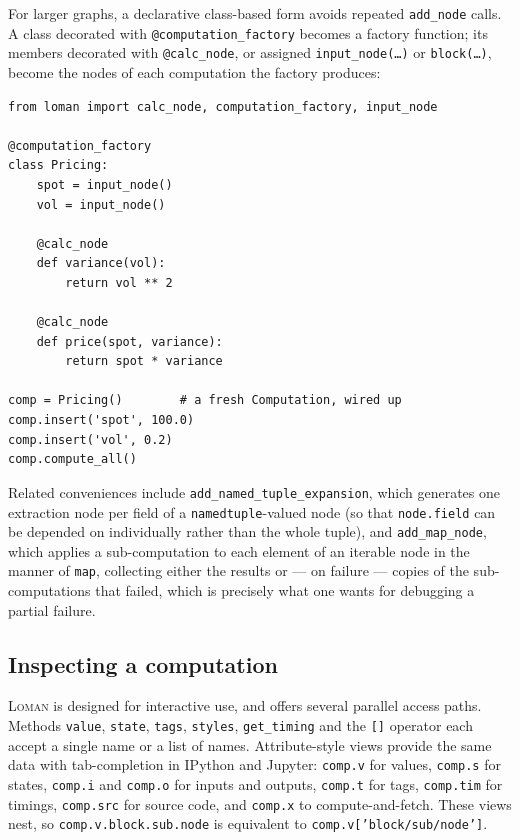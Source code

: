 \documentclass[11pt,a4paper]{article}
\newcommand{\loman}{\textsc{Loman}}
\newcommand{\code}[1]{\texttt{#1}}
\begin{document}
For larger graphs, a declarative class-based form avoids repeated
\code{add\_node} calls. A class decorated with \code{@computation\_factory}
becomes a factory function; its members decorated with \code{@calc\_node}, or
assigned \code{input\_node(\ldots)} or \code{block(\ldots)}, become the nodes of
each computation the factory produces:

\begin{lstlisting}
from loman import calc_node, computation_factory, input_node

@computation_factory
class Pricing:
    spot = input_node()
    vol = input_node()

    @calc_node
    def variance(vol):
        return vol ** 2

    @calc_node
    def price(spot, variance):
        return spot * variance

comp = Pricing()        # a fresh Computation, wired up
comp.insert('spot', 100.0)
comp.insert('vol', 0.2)
comp.compute_all()
\end{lstlisting}

Related conveniences include \code{add\_named\_tuple\_expansion}, which
generates one extraction node per field of a \code{namedtuple}-valued node (so
that \code{node.field} can be depended on individually rather than the whole
tuple), and \code{add\_map\_node}, which applies a sub-computation to each
element of an iterable node in the manner of \code{map}, collecting either the
results or --- on failure --- copies of the sub-computations that failed, which
is precisely what one wants for debugging a partial failure.

\subsection{Inspecting a computation}

\loman{} is designed for interactive use, and offers several parallel access
paths. Methods \code{value}, \code{state}, \code{tags}, \code{styles},
\code{get\_timing} and the \code{[]} operator each accept a single name or a
list of names. Attribute-style views provide the same data with tab-completion
in IPython and Jupyter: \code{comp.v} for values, \code{comp.s} for states,
\code{comp.i} and \code{comp.o} for inputs and outputs, \code{comp.t} for tags,
\code{comp.tim} for timings, \code{comp.src} for source code, and \code{comp.x}
to compute-and-fetch. These views nest, so \code{comp.v.block.sub.node} is
equivalent to \code{comp.v['block/sub/node']}.
\end{document}
